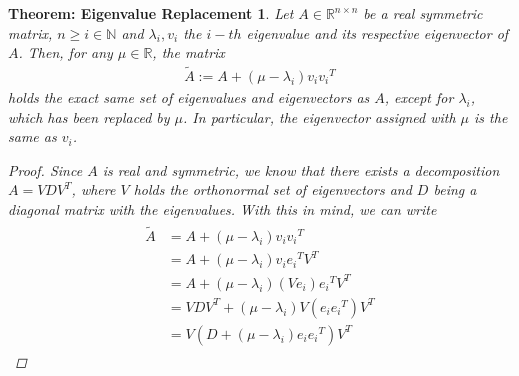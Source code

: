 \documentclass[10pt, a4paper, twocolumn]{article}
\begin{document}
    \newtheorem{eigenvalueReplacement}[]{Theorem: Eigenvalue Replacement}[section]
    \begin{eigenvalueReplacement}
        Let $A \in \mathbb{R}^{n \times n}$ be a real symmetric matrix, $n \geq i \in \mathbb{N}$ and $\lambda_i, v_i$
        the $i-th$ eigenvalue and its respective eigenvector of $A$. Then, for any $\mu \in \mathbb{R}$, the matrix
        \begin{align}
            \tilde{A} := A + \left(\mu - \lambda_i \right) v_i {v_i}^T
        \end{align}
        holds the exact same set of eigenvalues and eigenvectors as $A$, except for $\lambda_i$, which has been replaced by $\mu$.
        In particular, the eigenvector assigned with $\mu$ is the same as $v_i$.
        \begin{proof}[Proof]
            Since $A$ is real and symmetric, we know that there exists a decomposition $A=VDV^T$, where $V$ holds the orthonormal
            set of eigenvectors and $D$ being a diagonal matrix with the eigenvalues. With this in mind, we can write
            \begin{align}
                \begin{split}
                    \tilde{A} & = A + \left( \mu - \lambda_i \right) v_i {v_i}^T \\
                    & = A + \left( \mu - \lambda_i \right) v_i {e_i}^T V^T \\
                    & = A + \left( \mu - \lambda_i \right) \left( V e_i \right) {e_i}^T V^T \\
                    & = VDV^T + \left( \mu - \lambda_i \right) V \left( e_i {e_i}^T \right) V^T \\
                    & = V\left( D + \left( \mu - \lambda_i \right) e_i {e_i}^T \right) V^T
                \end{split}
            \end{align}
        \end{proof}
    \end{eigenvalueReplacement}
\end{document}
